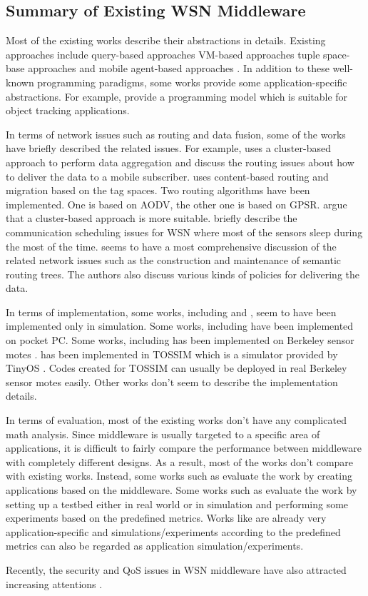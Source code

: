 \subsection{Summary of Existing WSN Middleware}
Most of the existing works describe their abstractions in details. Existing approaches include query-based approaches \cite{cougar, sina, tinydb} VM-based approaches \cite{magnetos, mate, smartmessage} tuple space-base approaches \cite{tinylime} and mobile agent-based approaches \cite{agilla, sensorware}. In addition to these well-known programming paradigms, some works provide some application-specific abstractions. For example, \cite{envirotrack} provide a programming model which is suitable for object tracking applications.

In terms of network issues such as routing and data fusion, some of the works have briefly described the related issues. For example, \cite{sina} uses a cluster-based approach to perform data aggregation and discuss the routing issues about how to deliver the data to a mobile subscriber. \cite{smartmessage} uses content-based routing and migration based on the tag spaces. Two routing algorithms have been implemented. One is based on AODV, the other one is based on GPSR. \cite{clustermiddleware} argue that a cluster-based approach is more suitable. \cite{tinylime} briefly describe the communication scheduling issues for WSN where most of the sensors sleep during the most of the time. \cite{tinydb} seems to have a most comprehensive discussion of the related network issues such as the construction and maintenance of semantic routing trees. The authors also discuss various kinds of policies for delivering the data.

In terms of implementation, some works, including \cite{sina} and \cite{dsware}, seem to have been implemented only in simulation. Some works, including \cite{impala, sensorware, smartmessage} have been implemented on pocket PC. Some works, including \cite{mate, tinylime, tinydb, envirotrack, agilla} has been implemented on Berkeley sensor motes \cite{crossbow}. \cite{tinycubus} has been implemented in TOSSIM \cite{tossim} which is a simulator provided by TinyOS \cite{nesc}. Codes created for TOSSIM can usually be deployed in real Berkeley sensor motes easily. Other works don't seem to describe the implementation details.

In terms of evaluation, most of the existing works don't have any complicated math analysis. Since middleware is usually targeted to a specific area of applications, it is difficult to fairly compare the performance between middleware with completely different designs. As a result, most of the works don't compare with existing works. Instead, some works such as \cite{sina, mate, sensorware, smartmessage, agilla} evaluate the work by creating applications based on the middleware. Some works such as \cite{impala, dsware, clustermiddleware, tinycubus, tinylime}  evaluate the work by setting up a testbed either in real world or in simulation and performing some experiments based on the predefined metrics. Works like \cite{envirotrack, tinydb} are already very application-specific and simulations/experiments according to the predefined metrics can also be regarded as application simulation/experiments.

Recently, the security and QoS issues in WSN middleware have also attracted increasing attentions \cite{milan}.